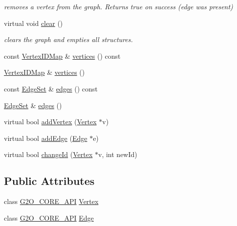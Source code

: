 \begin{DoxyCompactItemize}
\begin{DoxyCompactList}\small\item\em removes a vertex from the graph. Returns true on success (edge was present) \end{DoxyCompactList}\item 
virtual void \mbox{\hyperlink{classg2o_1_1_hyper_graph_a6b629dff2928dbd704ca81f24858e72f}{clear}} ()
\begin{DoxyCompactList}\small\item\em clears the graph and empties all structures. \end{DoxyCompactList}\item 
const \mbox{\hyperlink{classg2o_1_1_hyper_graph_a97307eac064ebf4b3e2cfbf0718035b5}{Vertex\+I\+D\+Map}} \& \mbox{\hyperlink{classg2o_1_1_hyper_graph_a95fcf7cd9d89562b2c26d99ede3548ed}{vertices}} () const
\item 
\mbox{\hyperlink{classg2o_1_1_hyper_graph_a97307eac064ebf4b3e2cfbf0718035b5}{Vertex\+I\+D\+Map}} \& \mbox{\hyperlink{classg2o_1_1_hyper_graph_a650107c875ef6f43d438d7d3e2ddf797}{vertices}} ()
\item 
const \mbox{\hyperlink{classg2o_1_1_hyper_graph_a5e2970e236c0dcb4eff7c205d7b6b4ae}{Edge\+Set}} \& \mbox{\hyperlink{classg2o_1_1_hyper_graph_a4edfd2ef4bf235cf78031c505cfd2fcc}{edges}} () const
\item 
\mbox{\hyperlink{classg2o_1_1_hyper_graph_a5e2970e236c0dcb4eff7c205d7b6b4ae}{Edge\+Set}} \& \mbox{\hyperlink{classg2o_1_1_hyper_graph_a2f9f023fe2fb491ef9af873b9e683006}{edges}} ()
\item 
virtual bool \mbox{\hyperlink{classg2o_1_1_hyper_graph_a7ef87ba3479827b24c6fc29c5fc3aa21}{add\+Vertex}} (\mbox{\hyperlink{classg2o_1_1_hyper_graph_1_1_vertex}{Vertex}} $\ast$v)
\item 
virtual bool \mbox{\hyperlink{classg2o_1_1_hyper_graph_a0f1d35009a2879b238c8148c33485c89}{add\+Edge}} (\mbox{\hyperlink{classg2o_1_1_hyper_graph_1_1_edge}{Edge}} $\ast$e)
\item 
virtual bool \mbox{\hyperlink{classg2o_1_1_hyper_graph_a74f0d7392e67762a85799db72a58a94c}{change\+Id}} (\mbox{\hyperlink{classg2o_1_1_hyper_graph_1_1_vertex}{Vertex}} $\ast$v, int new\+Id)
\end{DoxyCompactItemize}
\subsection*{Public Attributes}
\begin{DoxyCompactItemize}
\item 
class \mbox{\hyperlink{g2o__core__api_8h_a7a8d7648d6f1e26632566f335751d064}{G2\+O\+\_\+\+C\+O\+R\+E\+\_\+\+A\+PI}} \mbox{\hyperlink{classg2o_1_1_hyper_graph_a2aca385a3acb87b4f4365765afd10093}{Vertex}}
\item 
class \mbox{\hyperlink{g2o__core__api_8h_a7a8d7648d6f1e26632566f335751d064}{G2\+O\+\_\+\+C\+O\+R\+E\+\_\+\+A\+PI}} \mbox{\hyperlink{classg2o_1_1_hyper_graph_a59ab1fe84b0728a65a0ba15fce9b9cf7}{Edge}}
\end{DoxyCompactItemize}
